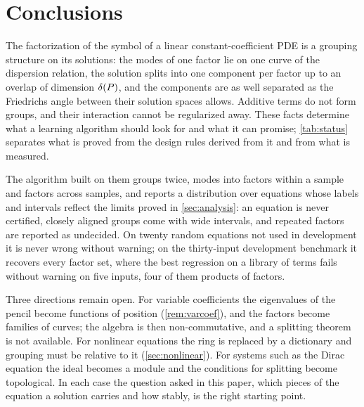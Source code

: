 \section{Conclusions}\label{sec:conclusion}
The factorization of the symbol of a linear constant-coefficient PDE is a grouping structure on its solutions: the
modes of one factor lie on one curve of the dispersion relation, the solution splits into one component per factor up
to an overlap of dimension $\delta(P)$, and the components are as well separated as the Friedrichs angle between their
solution spaces allows. Additive terms do not form groups, and their interaction cannot be regularized away. These
facts determine what a learning algorithm should look for and what it can promise; \cref{tab:status} separates what is
proved from the design rules derived from it and from what is measured.



The algorithm built on them groups twice, modes into factors within a sample and factors across samples, and reports a
distribution over equations whose labels and intervals reflect the limits proved in \cref{sec:analysis}: an equation
is never certified, closely aligned groups come with wide intervals, and repeated factors are reported as undecided.
On twenty random equations not used in development it is never wrong without warning; on the thirty-input development
benchmark it recovers every factor set,
where the best regression on a library of terms fails without warning on five inputs, four of them products of
factors.

Three directions remain open. For variable coefficients the eigenvalues of the pencil become functions of position
(\cref{rem:varcoef}), and the factors become families of curves; the algebra is then non-commutative, and a splitting
theorem is not available. For nonlinear equations the ring is replaced by a dictionary and grouping must be relative
to it (\cref{sec:nonlinear}). For systems such as the Dirac equation the ideal becomes a module and the conditions for
splitting become topological. In each case the question asked in this paper, which pieces of the equation a solution
carries and how stably, is the right starting point.
